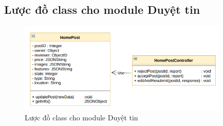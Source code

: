 \subsection{Lược đồ class cho module Duyệt tin}
\begin{figure}[H]
	\centering
	\includegraphics[width=10cm]{Image/333.png}
	\vspace{0.5cm}
	\caption{Lược đồ class cho module Duyệt tin}
\end{figure}